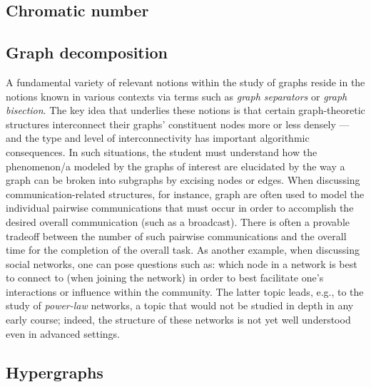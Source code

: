 \subsection{Chromatic number}




\subsection{Graph decomposition}


A fundamental variety of relevant notions within the study of graphs
reside in the notions known in various contexts via terms such as {\em
  graph separators} or {\em graph bisection}.  The key idea that
underlies these notions is that certain graph-theoretic structures
interconnect their graphs' constituent nodes more or less densely ---
and the type and level of interconnectivity has important algorithmic
consequences.  In such situations, the student must understand how the
phenomenon/a modeled by the graphs of interest are elucidated by the
way a graph can be broken into subgraphs by excising nodes or edges.
When discussing communication-related structures, for instance, graph
are often used to model the individual pairwise communications that
must occur in order to accomplish the desired overall communication
(such as a broadcast).  There is often a provable tradeoff between the
number of such pairwise communications and the overall time for the
completion of the overall task.  As another example, when discussing
social networks, one can pose questions such as: which node in a
network is best to connect to (when joining the network) in order to
best facilitate one's interactions or influence within the community.
The latter topic leads, e.g., to the study of {\em power-law}
networks, a topic that would not be studied in depth in any early
course; indeed, the structure of these networks is not yet well
understood even in advanced settings.



\subsection{Hypergraphs}

